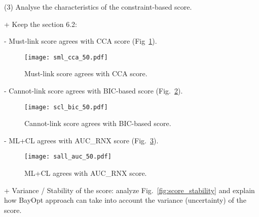 \vspace{9pt} \par
(3) Analyse the characteristics of the constraint-based score.

+ Keep the section 6.2:

\hspace{10pt }- Must-link score agrees with CCA score (Fig~\ref{fig:sml}).
\begin{figure}
\centering
\texttt{[image: sml\_cca\_50.pdf]}
\caption{Must-link score agrees with CCA score.}\label{fig:sml}
\end{figure}

\hspace{10pt }- Cannot-link score agrees with BIC-based score (Fig.~\ref{fig:scl}).
\begin{figure}
\centering
\texttt{[image: scl\_bic\_50.pdf]}
\caption{Cannot-link score agrees with BIC-based score.}\label{fig:scl}
\end{figure}

\hspace{10pt }- ML+CL agrees with AUC\_RNX score (Fig.~\ref{fig:sall}).
\begin{figure}
\centering
\texttt{[image: sall\_auc\_50.pdf]}
\caption{ML+CL agrees with AUC\_RNX score.}\label{fig:sall}
\end{figure}

\vspace{8pt} \par
+ Variance / Stability of the score: analyze Fig.~\ref{fig:score_stability} and explain how BayOpt approach can take into account the variance (uncertainty) of the score.

